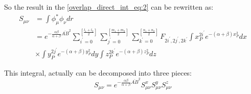 So the result in the \ref{overlap_direct_int_eq:2} can be rewritten as:
\begin{equation}
 \label{overlap_direct_int_eq:5}
\begin{split}
S_{\mu\nu}  &= \int \phi_{\mu}^{*}\phi_{\nu} dr \\
&= e^{-\frac{\alpha\beta}{\alpha+\beta}\overline{AB}^{2}}
   \sum_{i^{'}=0}^{\left[ \frac{l_{1}+l_{2}}{2}\right] }
   \sum_{j^{'}=0}^{\left[ \frac{m_{1}+m_{2}}{2}\right] }
   \sum_{k^{'}=0}^{\left[ \frac{n_{1}+n_{2}}{2}\right] }
   F_{2i^{'},2j^{'},2k^{'}}
   \int x_{P}^{2i^{'}}e^{-(\alpha+\beta)x_{P}^{2}} dx \\
&\times
   \int y_{P}^{2j^{'}}e^{-(\alpha+\beta)y_{P}^{2}} dy 
   \int z_{P}^{2k^{'}}e^{-(\alpha+\beta)z_{P}^{2}} dz  
\end{split}
\end{equation}

This integral, actually can be decomposed into three pieces:
\begin{equation}
 \label{overlap_direct_int_eq:6}
S_{\mu\nu} = e^{-\frac{\alpha\beta}{\alpha+\beta}\overline{AB}^{2}}
S_{\mu\nu}^{x}S_{\mu\nu}^{y}S_{\mu\nu}^{z}
\end{equation}

